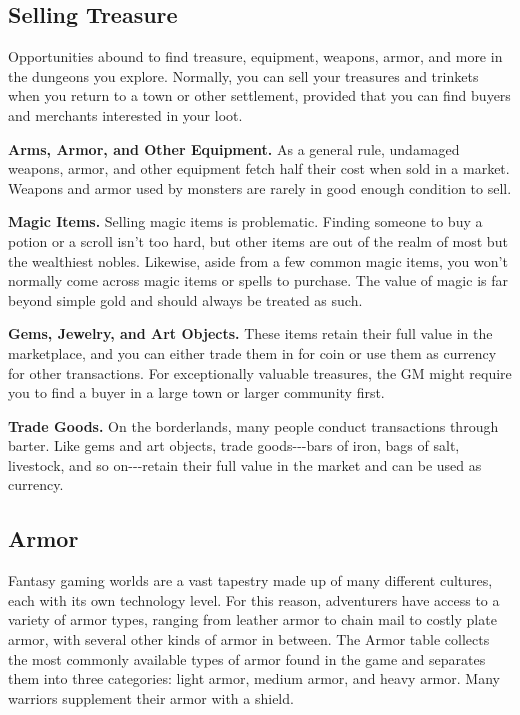 \documentclass[
]{article}
\begin{document}
\hypertarget{selling-treasure}{%
\subsection{Selling Treasure}\label{selling-treasure}}

Opportunities abound to find treasure, equipment, weapons, armor, and
more in the dungeons you explore. Normally, you can sell your treasures
and trinkets when you return to a town or other settlement, provided
that you can find buyers and merchants interested in your loot.

\textbf{Arms, Armor, and Other Equipment.} As a general rule, undamaged
weapons, armor, and other equipment fetch half their cost when sold in a
market. Weapons and armor used by monsters are rarely in good enough
condition to sell.

\textbf{Magic Items.} Selling magic items is problematic. Finding
someone to buy a potion or a scroll isn't too hard, but other items are
out of the realm of most but the wealthiest nobles. Likewise, aside from
a few common magic items, you won't normally come across magic items or
spells to purchase. The value of magic is far beyond simple gold and
should always be treated as such.

\textbf{Gems, Jewelry, and Art Objects.} These items retain their full
value in the marketplace, and you can either trade them in for coin or
use them as currency for other transactions. For exceptionally valuable
treasures, the GM might require you to find a buyer in a large town or
larger community first.

\textbf{Trade Goods.} On the borderlands, many people conduct
transactions through barter. Like gems and art objects, trade
goods-\/-\/-bars of iron, bags of salt, livestock, and so
on-\/-\/-retain their full value in the market and can be used as
currency.

\hypertarget{armor}{%
\subsection{Armor}\label{armor}}

Fantasy gaming worlds are a vast tapestry made up of many different
cultures, each with its own technology level. For this reason,
adventurers have access to a variety of armor types, ranging from
leather armor to chain mail to costly plate armor, with several other
kinds of armor in between. The Armor table collects the most commonly
available types of armor found in the game and separates them into three
categories: light armor, medium armor, and heavy armor. Many warriors
supplement their armor with a shield.
\end{document}
